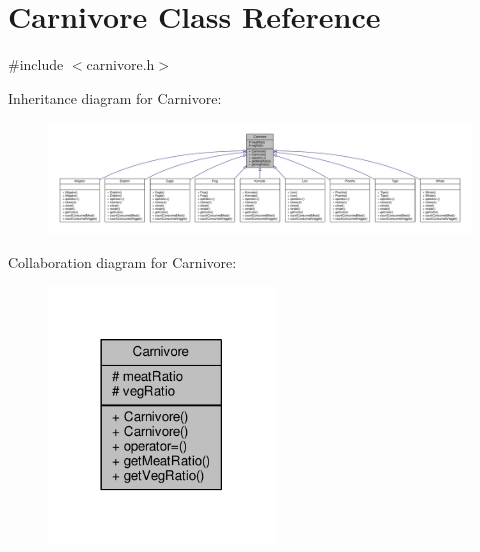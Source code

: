 \hypertarget{classCarnivore}{}\section{Carnivore Class Reference}
\label{classCarnivore}


{\ttfamily \#include $<$carnivore.\+h$>$}



Inheritance diagram for Carnivore\+:
\nopagebreak
\begin{figure}[H]
\begin{center}
\leavevmode
\includegraphics[width=350pt]{classCarnivore__inherit__graph}
\end{center}
\end{figure}


Collaboration diagram for Carnivore\+:
\nopagebreak
\begin{figure}[H]
\begin{center}
\leavevmode
\includegraphics[width=170pt]{classCarnivore__coll__graph}
\end{center}
\end{figure}
